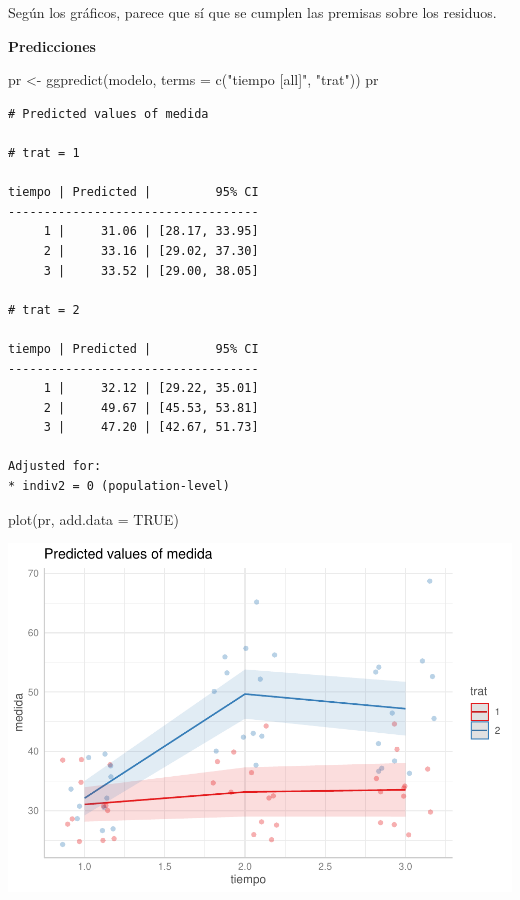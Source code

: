 \documentclass[
]{book}
\newenvironment{Shaded}{\begin{snugshade}}{\end{snugshade}}
\newcommand{\AttributeTok}[1]{\textcolor[rgb]{0.77,0.63,0.00}{#1}}
\newcommand{\ConstantTok}[1]{\textcolor[rgb]{0.00,0.00,0.00}{#1}}
\newcommand{\FunctionTok}[1]{\textcolor[rgb]{0.00,0.00,0.00}{#1}}
\newcommand{\NormalTok}[1]{#1}
\newcommand{\OtherTok}[1]{\textcolor[rgb]{0.56,0.35,0.01}{#1}}
\newcommand{\StringTok}[1]{\textcolor[rgb]{0.31,0.60,0.02}{#1}}
\begin{document}
Según los gráficos, parece que sí que se cumplen las premisas sobre los residuos.

\textbf{Predicciones}

\begin{Shaded}
\begin{Highlighting}[]
\NormalTok{pr }\OtherTok{\textless{}{-}} \FunctionTok{ggpredict}\NormalTok{(modelo, }\AttributeTok{terms =} \FunctionTok{c}\NormalTok{(}\StringTok{"tiempo [all]"}\NormalTok{, }\StringTok{"trat"}\NormalTok{))}
\NormalTok{pr}
\end{Highlighting}
\end{Shaded}

\begin{verbatim}
# Predicted values of medida

# trat = 1

tiempo | Predicted |         95% CI
-----------------------------------
     1 |     31.06 | [28.17, 33.95]
     2 |     33.16 | [29.02, 37.30]
     3 |     33.52 | [29.00, 38.05]

# trat = 2

tiempo | Predicted |         95% CI
-----------------------------------
     1 |     32.12 | [29.22, 35.01]
     2 |     49.67 | [45.53, 53.81]
     3 |     47.20 | [42.67, 51.73]

Adjusted for:
* indiv2 = 0 (population-level)
\end{verbatim}

\begin{Shaded}
\begin{Highlighting}[]
\FunctionTok{plot}\NormalTok{(pr, }\AttributeTok{add.data =} \ConstantTok{TRUE}\NormalTok{)}
\end{Highlighting}
\end{Shaded}

\includegraphics{fig_out/unnamed-chunk-111-1.pdf}
\end{document}
